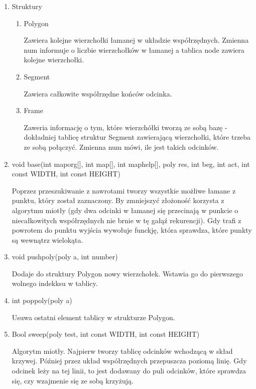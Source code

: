 \documentclass{article}
\begin{document}
\begin{enumerate}

\item Struktury

\begin{enumerate}

\item Polygon

Zawiera kolejne wierzchołki łamanej w układzie współrzędnych. Zmienna num informuje o liczbie wierzchołków w łamanej a tablica node zawiera kolejne wierzchołki.

\item Segment

Zawiera całkowite współrzędne końców odcinka.

\item Frame

Zaweria informację o tym, które wierzchółki tworzą ze sobą bazę - dokładniej tablicę struktur Segment zawierającą wierzchołki, które trzeba ze sobą połączyć. Zmienna num mówi, ile jest takich odcinków.

\end{enumerate}

\item void base(int maporg[], int map[], int map\textunderscore help[], poly res, int beg, int act, int const WIDTH, int const HEIGHT)

Poprzez przeszukiwanie z nawrotami tworzy wszystkie możliwe łamane z punktu, który został zaznaczony. By zmniejszyć złożoność korzysta z algorytmu  miotły (gdy dwa odcinki w łamanej się przecinają w punkcie o niecałkowitych współrzędnych nie brnie w tę gałąź rekurencji). Gdy trafi z powrotem do punktu wyjścia wywołuje funckję, która sprawdza, które punkty są wewnątrz wielokąta.

\item void push\textunderscore poly(poly a, int number)

Dodaje do struktury Polygon nowy wierzchołek. Wstawia go do pierwszego wolnego indekksu w tablicy.

\item int pop\textunderscore poly(poly a)

Usuwa ostatni element tablicy w strukturze Polygon.

\item \textunderscore Bool sweep(poly test, int const WIDTH, int const HEIGHT)

Algorytm miotły. Najpierw tworzy tablicę odcinków wchodzącą w skład krzywej. Później przez układ współrzędnych przepuszcza poziomą linię. Gdy odcinek leży na tej linii, to jest dodawany do puli odcinków, które sprawdza się, czy wzajmenie się ze sobą krzyżują.


\end{enumerate}
\end{document}
